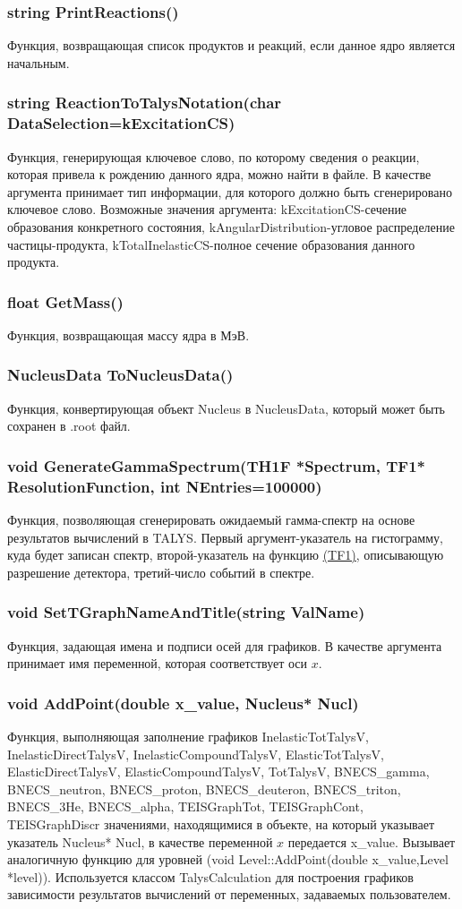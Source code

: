 \documentclass[a4paper,12pt]{extarticle}
\begin{document}
\subsubsection{string PrintReactions()}
Функция, возвращающая список продуктов и реакций, если данное ядро является начальным.
\subsubsection{string ReactionToTalysNotation(char DataSelection=kExcitationCS)}
Функция, генерирующая ключевое слово, по которому сведения о реакции, которая привела к рождению данного ядра, можно найти в файле. В качестве аргумента принимает тип информации, для которого должно быть сгенерировано ключевое слово. Возможные значения аргумента: kExcitationCS-сечение образования конкретного состояния, kAngularDistribution-угловое распределение частицы-продукта, kTotalInelasticCS-полное сечение образования данного продукта.
\subsubsection{float GetMass()}
Функция, возвращающая массу ядра в МэВ.
\subsubsection{NucleusData ToNucleusData()}
Функция, конвертирующая объект Nucleus в NucleusData, который может быть сохранен в .root файл.
\subsubsection{void GenerateGammaSpectrum(TH1F *Spectrum, TF1* ResolutionFunction, int NEntries=100000)}
Функция, позволяющая сгенерировать ожидаемый гамма-спектр на основе результатов вычислений в TALYS. Первый аргумент-указатель на гистограмму, куда будет записан спектр, второй-указатель на функцию \href{https://root.cern.ch/doc/master/classTF1.html}{(TF1)}, описывающую разрешение детектора, третий-число событий в спектре.
\subsubsection{void SetTGraphNameAndTitle(string ValName)}
Функция, задающая имена и подписи осей для графиков. В качестве аргумента принимает имя переменной, которая соответствует оси $x$.
\subsubsection{void AddPoint(double x_value, Nucleus* Nucl)}
Функция, выполняющая заполнение графиков InelasticTotTalysV, InelasticDirectTalysV, InelasticCompoundTalysV, ElasticTotTalysV, ElasticDirectTalysV, ElasticCompoundTalysV, TotTalysV, BNECS_gamma, BNECS_neutron, BNECS_proton, BNECS_deuteron, BNECS_triton, BNECS_3He, BNECS_alpha, TEISGraphTot, TEISGraphCont, TEISGraphDiscr значениями, находящимися в объекте, на который указывает указатель Nucleus* Nucl, в качестве переменной $x$ передается x_value. Вызывает аналогичную функцию для уровней (void Level::AddPoint(double x_value,Level *level)). Используется классом TalysCalculation для построения графиков зависимости результатов вычислений от переменных, задаваемых пользователем.
\end{document}
